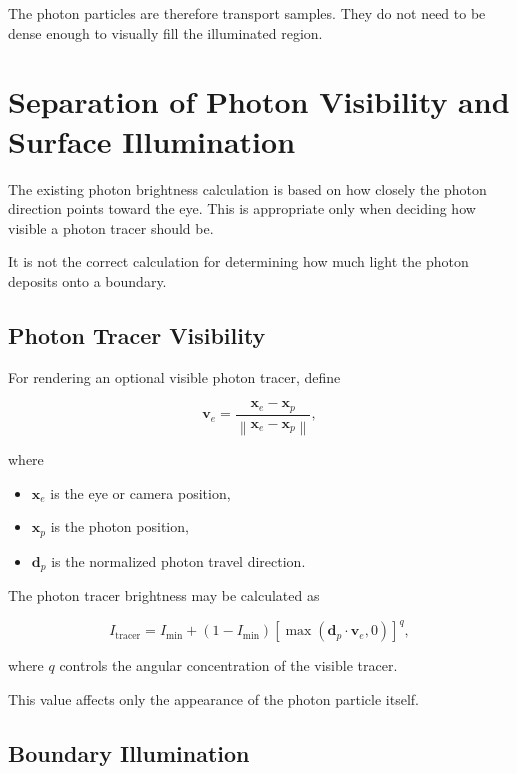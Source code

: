 \documentclass[11pt]{article}
\begin{document}
The photon particles are therefore transport samples. They do not need to be
dense enough to visually fill the illuminated region.

\section{Separation of Photon Visibility and Surface Illumination}

The existing photon brightness calculation is based on how closely the photon
direction points toward the eye. This is appropriate only when deciding how
visible a photon tracer should be.

It is not the correct calculation for determining how much light the photon
deposits onto a boundary.

\subsection{Photon Tracer Visibility}

For rendering an optional visible photon tracer, define

\begin{equation}
    \mathbf{v}_{e}
    =
    \frac{\mathbf{x}_{e}-\mathbf{x}_{p}}
    {\left\|\mathbf{x}_{e}-\mathbf{x}_{p}\right\|},
\end{equation}

where

\begin{itemize}
    \item $\mathbf{x}_{e}$ is the eye or camera position,
    \item $\mathbf{x}_{p}$ is the photon position,
    \item $\mathbf{d}_{p}$ is the normalized photon travel direction.
\end{itemize}

The photon tracer brightness may be calculated as

\begin{equation}
    I_{\mathrm{tracer}}
    =
    I_{\min}
    +
    \left(1-I_{\min}\right)
    \left[
        \max\left(
            \mathbf{d}_{p}\cdot\mathbf{v}_{e},
            0
        \right)
    \right]^{q},
\end{equation}

where $q$ controls the angular concentration of the visible tracer.

This value affects only the appearance of the photon particle itself.

\subsection{Boundary Illumination}
\end{document}
